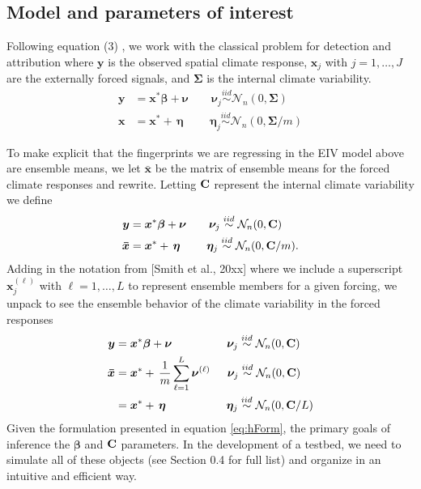 \documentclass[12pt]{article}
\newcommand{\C}{\ensuremath{\text{Cov}}}
\def\*#1{\bm{#1}}
\def\C{\textbf{\text{C}}}
\begin{document}
\subsection{Model and parameters of interest}
Following equation (3) \cite{hannart16}, we work with the classical problem for detection and attribution where $\*y$ is the observed spatial climate response, $\* x_j$ with $j = 1, \dots, J$ are the externally forced signals, and $\*\Sigma$ is the internal climate variability.
\begin{align}
\*y &= \*x^* \*\beta + \*\nu \qquad \*\nu_j \stackrel{iid}{\sim} \mathcal{N}_n(0, \*\Sigma) \nonumber\\
\* x &= \*x^* + \, \*\eta \qquad \,\, \*\eta_j \stackrel{iid}{\sim}  \mathcal{N}_n(0, \*\Sigma/m) 
\end{align}

To make explicit that the fingerprints we are regressing in the EIV model above are ensemble means, we let $\*{\bar x}$ be the matrix of ensemble means for the forced climate responses and rewrite. Letting $\C$ represent the internal climate variability we define 
\begin{align} \label{eq:hForm}
\*y &= \*x^* \*\beta + \*\nu \qquad \*\nu_j \stackrel{iid}{\sim}  \mathcal{N}_n(0, \C) \nonumber\\
\*{\bar x} &= \* x^* + \, \*\eta \qquad \,\, \*\eta_j \stackrel{iid}{\sim}  \mathcal{N}_n(0, \C/m).
\end{align}
Adding in the notation from [Smith et al., 20xx] where we include a superscript $\*x_j^{(\ell)}$ with $\ell = 1, \dots , L$ to represent ensemble members for a given forcing, we unpack to see the ensemble behavior of the climate variability in the forced responses
\begin{align}
\*y &= \*x^* \*\beta + \*\nu \qquad \qquad \:\:\:\, \*\nu_j \stackrel{iid}{\sim}  \mathcal{N}_n(0, \C) \nonumber\\
\*{\bar x} &= \* x^* + \, \frac{1}{m}  \sum_{\ell=1}^L \*\nu^{(\ell)} \quad \, \,\,  \*\nu_j \stackrel{iid}{\sim}  \mathcal{N}_n(0, \C) \\
&= \* x^* + \, \*\eta \qquad \qquad \quad \,\, \*\eta_j \stackrel{iid}{\sim}  \mathcal{N}_n(0, \C/L) \nonumber
\end{align}
Given the formulation presented in equation \ref{eq:hForm}, the primary goals of inference the $\*\beta$ and $\C$ parameters. In the development of a testbed, we need to simulate all of these objects (see Section 0.4 for full list) and organize in an intuitive and efficient way.
\end{document}
